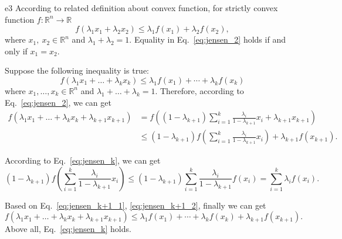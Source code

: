 \documentclass{article}
\begin{document}
\begin{PROOF}{e3} 
According to related definition about convex function\cite{boyd2004convex}, for strictly convex function $f: \mathbb{R}^n \rightarrow \mathbb{R}$
\begin{equation}\label{eq:jensen_2}
    f(\lambda_1 x_1 + \lambda_2 x_2) \le \lambda_1 f(x_1) + \lambda_2 f(x_2), 
\end{equation}
where $x_1, ~x_2 \in \mathbb{R}^{n}$ and $\lambda_1 + \lambda_2 = 1$. Equality in Eq.~\ref{eq:jensen_2} holds if and only if $x_1 = x_2$.

Suppose the following inequality is true:
\begin{equation}\label{eq:jensen_k}
    f(\lambda_1 x_1 + \dots + \lambda_k x_k) \le \lambda_1 f(x_1) + \cdots + \lambda_k f(x_k)
\end{equation}
where $x_1, \dots, x_k \in \mathbb{R}^{n}$ and $\lambda_1 + \dots + \lambda_k = 1$. Therefore, according to Eq.~\ref{eq:jensen_2}, we can get
\begin{equation}\label{eq:jensen_k+1_1}
\begin{aligned}
    f(\lambda_1 x_1 + \dots + \lambda_k x_k  + \lambda_{k+1} x_{k+1}) &= f\left(
        (1-\lambda_{k+1})\sum_{i=1}^k \frac{\lambda_{i}}{1-\lambda_{k+1}} x_i + \lambda_{k+1} x_{k+1}
    \right)\\
    &\le (1-\lambda_{k+1}) f\left(\sum_{i=1}^k \frac{\lambda_{i}}{1-\lambda_{k+1}} x_i \right) + \lambda_{k+1} f(x_{k+1}).
\end{aligned}
\end{equation}

According to Eq.~\ref{eq:jensen_k}, we can get
\begin{equation}\label{eq:jensen_k+1_2}
    (1-\lambda_{k+1})f\left(\sum_{i=1}^k \frac{\lambda_{i}}{1-\lambda_{k+1}} x_i \right) \le (1-\lambda_{k+1})\sum_{i=1}^k \frac{\lambda_{i}}{1-\lambda_{k+1}} f(x_i) = \sum_{i=1}^k \lambda_{i} f(x_i).
\end{equation}

Based on Eq.~\ref{eq:jensen_k+1_1}, \ref{eq:jensen_k+1_2}, finally we can get
\begin{equation}\label{eq:jensen_k+1}
    f(\lambda_1 x_1 + \dots + \lambda_k x_k  + \lambda_{k+1} x_{k+1}) \le \lambda_1 f(x_1) + \cdots + \lambda_k f(x_k) + \lambda_{k+1} f(x_{k+1}).
\end{equation}
Above all, Eq.~\ref{eq:jensen_k} holds.


\end{PROOF}
\end{document}
